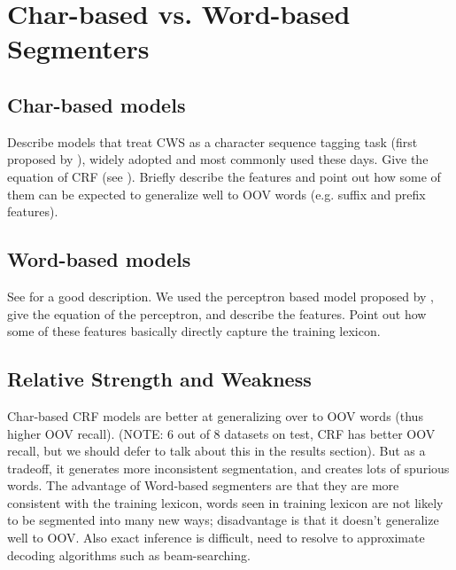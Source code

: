 \section{Char-based vs. Word-based Segmenters}

\subsection{Char-based models}
Describe models that treat CWS as a character sequence tagging task (first proposed by \cite{Xue:2003:IJCLCLP}), widely adopted and most commonly used these days.
Give the equation of CRF (see \cite{Tseng:2005:SIGHAN}). Briefly describe the features and point out how some of them can be expected to generalize well to OOV words (e.g. suffix and prefix features).

\subsection{Word-based models}
See \cite{Sun:2010:COLING} for a good description. We used the perceptron based model proposed by \cite{Zhang:2007:ACL}, give the equation of the perceptron, and describe the features. Point out how some of these features basically directly capture the training lexicon.

\subsection{Relative Strength and Weakness}
Char-based CRF models are better at generalizing over to OOV words (thus higher OOV recall).  (NOTE: 6 out of 8 datasets on test, CRF has better OOV recall, but we should defer to talk about this in the results section). But as a tradeoff, it generates more inconsistent segmentation, and creates lots of spurious words.
 The advantage of Word-based segmenters are that they are more consistent with the training lexicon, words seen in training lexicon are not likely to be segmented into many new ways; disadvantage is that it doesn't generalize well to OOV. Also exact inference is difficult, need to resolve to approximate decoding algorithms such as beam-searching.
 